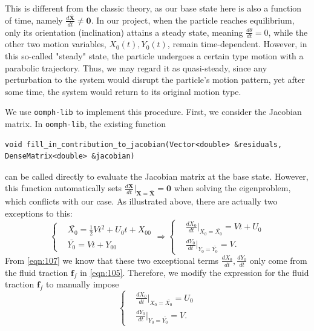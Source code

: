 \documentclass[a4paper,12pt]{article}
\begin{document}
This is different from the classic theory, as our base state here is also a function of time, namely $\frac{d\bar{\bm{X}}}{dt}\neq\bm{0}$. In our project, when the particle reaches equilibrium, only its orientation (inclination) attains a steady state, meaning  $\frac{d\theta}{dt}=0$, while the other two motion variables, $X_0(t), Y_0(t)$, remain time-dependent. However, in this so-called "steady" state, the particle undergoes a certain type motion with a parabolic trajectory. Thus, we may regard it as quasi-steady, since any perturbation to the system would disrupt the particle's motion pattern, yet after some time, the system would return to its original motion type. 

We use \texttt{oomph-lib} to implement this procedure. First, we consider the Jacobian matrix. In \texttt{oomph-lib}, the existing function
\begin{lstlisting}
void fill_in_contribution_to_jacobian(Vector<double> &residuals, DenseMatrix<double> &jacobian)
\end{lstlisting}
can be called directly to evaluate the Jacobian matrix at the base state. However, this function automatically sets $\frac{d\bm{X}}{dt}\Big|_{\bm{X}=\bar{\bm{X}}}=\bm{0}$ when solving the eigenproblem, which conflicts with our case. As illustrated above, there are actually two exceptions to this:
\begin{equation}
	\label{eqn:113}
	\left\{\begin{aligned}
		&\bar{X_0}=\frac{1}{2}Vt^2+U_0t+X_{00} \\
		&\bar{Y_0}=Vt+Y_{00} 
	\end{aligned}\right. \Longrightarrow 
\left\{\begin{aligned}
	&\frac{dX_0}{dt}\Big|_{X_0=\bar{X_0}}=Vt+U_0 \\
	&\frac{dY_0}{dt}\Big|_{Y_0=\bar{Y_0}}=V.
\end{aligned}\right.
\end{equation}
From \eqref{eqn:107} we know that these two exceptional terms $\frac{dX_0}{dt},\frac{dY_0}{dt}$ only come from the fluid traction $\bm{f}_f$ in \eqref{eqn:105}. Therefore, we modify the expression for the fluid traction $\bm{f}_f$ to manually impose
\begin{equation}
	\label{eqn:114}
	\left\{\begin{aligned}
		&\frac{dX_0}{dt}\Big|_{X_0=\bar{X_0}}=U_0 \\
		&\frac{dY_0}{dt}\Big|_{Y_0=\bar{Y_0}}=V.
	\end{aligned}\right.
\end{equation}
\end{document}
